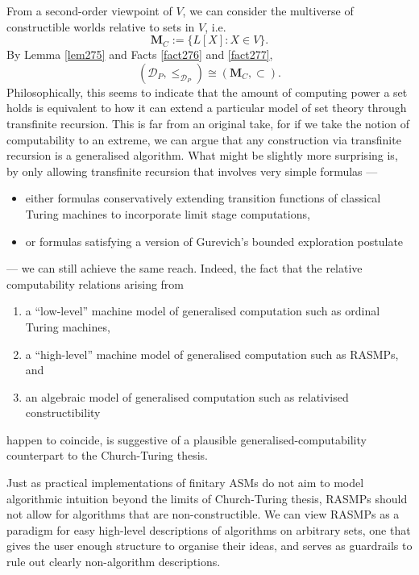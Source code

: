 \documentclass[12pt, twoside]{memoir}
\numberwithin{equation}{section}
\theoremstyle{definition}
\theoremstyle{remark}
\theoremstyle{definition}
\theoremstyle{definition}
\theoremstyle{definition}
\theoremstyle{remark}
\begin{document}
From a second-order viewpoint of $V$, we can consider the multiverse of constructible worlds relative to sets in $V$, i.e.
\begin{equation*}
    \mathbf{M}_C := \{L[X] : X \in V\} \text{.}
\end{equation*}
By Lemma \ref{lem275} and Facts \ref{fact276} and \ref{fact277}, 
\begin{equation*}
    (\mathcal{D}_P, \leq_{\mathcal{D}_P}) \cong (\mathbf{M}_C, \subset) \text{.}
\end{equation*}
Philosophically, this seems to indicate that the amount of computing power a set holds is equivalent to how it can extend a particular model of set theory through transfinite recursion. This is far from an original take, for if we take the notion of computability to an extreme, we can argue that any construction via transfinite recursion is a generalised algorithm. What might be slightly more surprising is, by only allowing transfinite recursion that involves very simple formulas ---
\begin{itemize}
    \item either formulas conservatively extending transition functions of classical Turing machines to incorporate limit stage computations,
    \item or formulas satisfying a version of Gurevich's bounded exploration postulate
\end{itemize}
--- we can still achieve the same reach. Indeed, the fact that the relative computability relations arising from
\begin{enumerate}[label=(GCT\arabic*), leftmargin=50pt]
    \item a ``low-level'' machine model of generalised computation such as ordinal Turing machines, 
    \item a ``high-level'' machine model of generalised computation such as RASMPs, and
    \item an algebraic model of generalised computation such as relativised constructibility
\end{enumerate}
happen to coincide, is suggestive of a plausible generalised-computability counterpart to the Church-Turing thesis.

Just as practical implementations of finitary ASMs do not aim to model algorithmic intuition beyond the limits of Church-Turing thesis, RASMPs should not allow for algorithms that are non-constructible. We can view RASMPs as a paradigm for easy high-level descriptions of algorithms on arbitrary sets, one that gives the user enough structure to organise their ideas, and serves as guardrails to rule out clearly non-algorithm descriptions.
\end{document}
